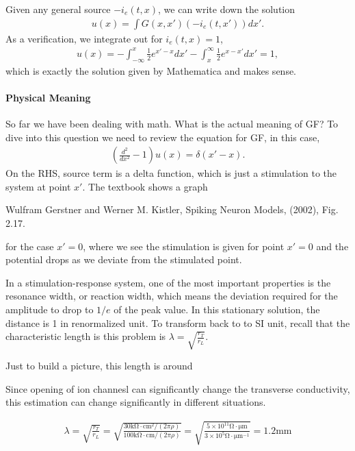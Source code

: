 \documentclass[letterpaper,10pt,english]{sphinxmanual}
\begin{document}
Given any general source \(-i_e(t,x)\), we can write down the solution
\begin{equation*}
\begin{split}u(x) = \int G(x,x') (-i_e(t,x') ) dx'.\end{split}
\end{equation*}
As a verification, we integrate out for \(i_e(t,x) = 1\),
\begin{equation*}
\begin{split}u(x) = -\int_{-\infty}^{x}  \frac{1}{2}e^{x'-x} dx' - \int_{x}^{\infty} \frac{1}{2}e^{x - x'} dx' = 1,\end{split}
\end{equation*}
which is exactly the solution given by Mathematica and makes sense.


\paragraph{Physical Meaning}
\label{\detokenize{equation-solving-in-neuroscience/green-function:physical-meaning}}
So far we have been dealing with math. What is the actual meaning of GF? To dive into this question we need to review the equation for GF, in this case,
\begin{equation*}
\begin{split}\left(\frac{d^2}{dx^2} -1\right) u(x) = \delta(x'-x).\end{split}
\end{equation*}
On the RHS, source term is a delta function, which is just a stimulation to the system at point \(x'\). The textbook shows a graph %
\begin{footnote}[3]\sphinxAtStartFootnote
Wulfram Gerstner and Werner M. Kistler, Spiking Neuron Models, (2002), Fig. 2.17.
%
\end{footnote} for the case \(x'=0\), where we see the stimulation is given for point \(x'=0\) and the potential drops as we deviate from the stimulated point.

In a stimulation-response system, one of the most important properties is the resonance width, or reaction width, which means the deviation required for the amplitude to drop to \(1/e\) of the peak value. In this stationary solution, the distance is 1 in renormalized unit. To transform back to to SI unit, recall that the characteristic length is this problem is \(\lambda = \sqrt{\frac{r_T}{r_L}}\).

Just to build a picture, this length is around %
\begin{footnote}[4]\sphinxAtStartFootnote
Since opening of ion channesl can significantly change the transverse conductivity, this estimation can change significantly in different situations.
%
\end{footnote}
\begin{equation*}
\begin{split}\lambda = \sqrt{ \frac{r_T}{r_L}} = \sqrt{ \frac{30\mathrm{k\Omega\cdot cm^2}/(2\pi \rho)}{ 100 \mathrm{k\Omega\cdot cm}/(2\pi \rho) } } = \sqrt{ \frac{5\times 10^{11} \mathrm{\Omega \cdot \mu m} }{ 3\times 10^{5} \mathrm{\Omega \cdot \mu m^{-1}}  } } = 1.2\mathrm{mm}\end{split}
\end{equation*}
\end{document}
